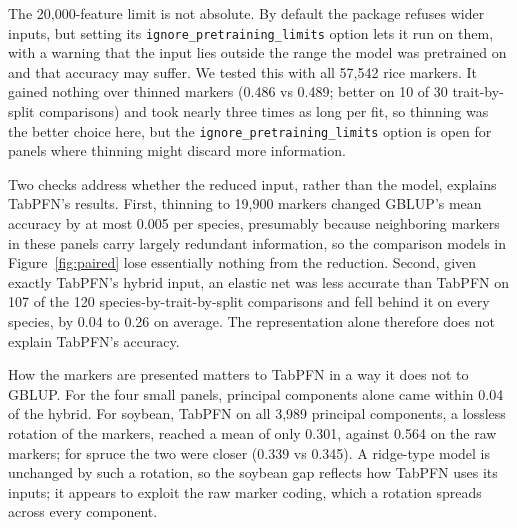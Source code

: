 \documentclass[11pt]{article}
\begin{document}
The 20,000-feature limit is not absolute. By default the package refuses wider inputs, but setting its \texttt{ignore\_\allowbreak{}pretraining\_\allowbreak{}limits} option lets it run on them, with a warning that the input lies outside the range the model was pretrained on and that accuracy may suffer. We tested this with all 57,542 rice markers. It gained nothing over thinned markers (0.486 vs 0.489; better on 10 of 30 trait-by-split comparisons) and took nearly three times as long per fit, so thinning was the better choice here, but the \texttt{ignore\_\allowbreak{}pretraining\_\allowbreak{}limits} option is open for panels where thinning might discard more information.

\begin{table}[tbp]
\centering
\caption{Mean accuracy (Pearson $r$) averaged over the three traits and 10 splits, by input, for the four species with more markers than TabPFN-3.5 accepts. *In 7 of 30 rice fits the elastic net kept no markers and predicted a constant, so the correlation is undefined; those fits are counted as $r = 0$.}
\label{tab:inputs}
\small
\setlength{\tabcolsep}{4pt}
\resizebox{\linewidth}{!}{}
\end{table}

Two checks address whether the reduced input, rather than the model, explains TabPFN's results. First, thinning to 19,900 markers changed GBLUP's mean accuracy by at most 0.005 per species, presumably because neighboring markers in these panels carry largely redundant information, so the comparison models in Figure~\ref{fig:paired} lose essentially nothing from the reduction. Second, given exactly TabPFN's hybrid input, an elastic net was less accurate than TabPFN on 107 of the 120 species-by-trait-by-split comparisons and fell behind it on every species, by 0.04 to 0.26 on average. The representation alone therefore does not explain TabPFN's accuracy.

How the markers are presented matters to TabPFN in a way it does not to GBLUP. For the four small panels, principal components alone came within 0.04 of the hybrid. For soybean, TabPFN on all 3,989 principal components, a lossless rotation of the markers, reached a mean of only 0.301, against 0.564 on the raw markers; for spruce the two were closer (0.339 vs 0.345). A ridge-type model is unchanged by such a rotation, so the soybean gap reflects how TabPFN uses its inputs; it appears to exploit the raw marker coding, which a rotation spreads across every component.
\end{document}
